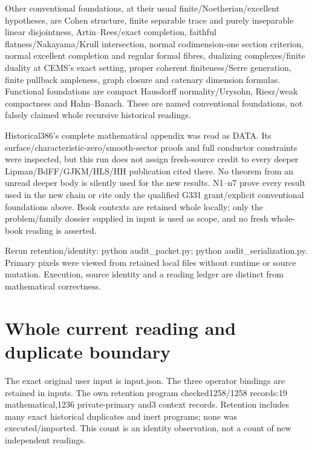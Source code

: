 \documentclass[11pt]{article}
\begin{document}
Other conventional foundations, at their usual finite/Noetherian/excellent hypotheses, are Cohen structure, finite separable trace and purely inseparable linear disjointness, Artin--Rees/exact completion, faithful flatness/Nakayama/Krull intersection, normal codimension-one section criterion, normal excellent completion and regular formal fibres, dualizing complexes/finite duality at CEMS's exact setting, proper coherent finiteness/Serre generation, finite pullback ampleness, graph closure and catenary dimension formulas. Functional foundations are compact Hausdorff normality/Urysohn, Riesz/weak compactness and Hahn--Banach. These are named conventional foundations, not falsely claimed whole recursive historical readings.

Historical386's complete mathematical appendix was read as DATA. Its surface/characteristic-zero/smooth-sector proofs and full conductor constraints were inspected, but this run does not assign fresh-source credit to every deeper Lipman/BdFF/GJKM/HLS/HH publication cited there. No theorem from an unread deeper body is silently used for the new results. N1--n7 prove every result used in the new chain or cite only the qualified G331 grant/explicit conventional foundations above. Book contexts are retained whole locally; only the problem/family dossier supplied in input is used as scope, and no fresh whole-book reading is asserted.

Rerun retention/identity: python audit\_packet.py; python audit\_serialization.py. Primary pixels were viewed from retained local files without runtime or source mutation. Execution, source identity and a reading ledger are distinct from mathematical correctness.
\section{Whole current reading and duplicate boundary}

The exact original user input is input.json. The three operator bindings are retained in inputs. The own retention program checked1258/1258 records:19 mathematical,1236 private-primary and3 context records. Retention includes many exact historical duplicates and inert programs; none was executed/imported. This count is an identity observation, not a count of new independent readings.
\end{document}

